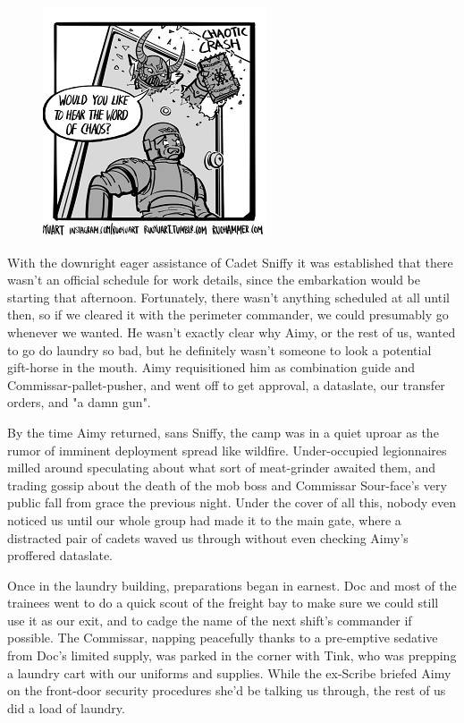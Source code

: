 \begin{figure}
	\begin{center}
		\includegraphics[width=\figwidth]{pics/21/62.png}
	\end{center}
\end{figure}
With the downright eager assistance of Cadet Sniffy it was established that there wasn't an official schedule for work details, since the embarkation would be starting that afternoon. 
Fortunately, there wasn't anything scheduled at all until then, so if we cleared it with the perimeter commander, we could presumably go whenever we wanted. 
He wasn't exactly clear why Aimy, or the rest of us, wanted to go do laundry so bad, but he definitely wasn't someone to look a potential gift-horse in the mouth. 
Aimy requisitioned him as combination guide and Commissar-pallet-pusher, and went off to get approval, a dataslate, our transfer orders, and "a damn gun".

By the time Aimy returned, sans Sniffy, the camp was in a quiet uproar as the rumor of imminent deployment spread like wildfire. 
Under-occupied legionnaires milled around speculating about what sort of meat-grinder awaited them, and trading gossip about the death of the mob boss and Commissar Sour-face's very public fall from grace the previous night. 
Under the cover of all this, nobody even noticed us until our whole group had made it to the main gate, where a distracted pair of cadets waved us through without even checking Aimy's proffered dataslate.

Once in the laundry building, preparations began in earnest. 
Doc and most of the trainees went to do a quick scout of the freight bay to make sure we could still use it as our exit, and to cadge the name of the next shift's commander if possible. 
The Commissar, napping peacefully thanks to a pre-emptive sedative from Doc's limited supply, was parked in the corner with Tink, who was prepping a laundry cart with our uniforms and supplies. 
While the ex-Scribe briefed Aimy on the front-door security procedures she'd be talking us through, the rest of us did a load of laundry.

